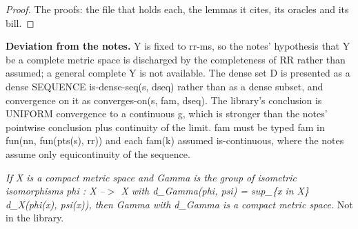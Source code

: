 %
\begin{proof}
%
The proofs: the file that holds each, the lemmas it cites, its oracles and its bill.
%
%
%
%
%
%
%
%
%
%
%
%
%
\end{proof}
%
\noindent\textbf{Deviation from the notes.} Y is fixed to rr-ms, so the notes' hypothesis that Y be a complete metric space is discharged by the completeness of RR rather than assumed; a general complete Y is not available. The dense set D is presented as a dense SEQUENCE is-dense-seq(s, dseq) rather than as a dense subset, and convergence on it as converges-on(s, fam, dseq). The library's conclusion is UNIFORM convergence to a continuous g, which is stronger than the notes' pointwise conclusion plus continuity of the limit. fam must be typed fam in fun(nn, fun(pts(s), rr)) and each fam(k) assumed is-continuous, where the notes assume only equicontinuity of the sequence.
%
\renewcommand{\thethm}{3.37}
\begin{prop}\label{thm:calculus-3.37}
%
\textit{If X is a compact metric space and Gamma is the group of isometric isomorphisms phi : X --$>$ X with d\_Gamma(phi, psi) = sup\_\{x in X\} d\_X(phi(x), psi(x)), then Gamma with d\_Gamma is a compact metric space.}
%
Not in the library.
%
\end{prop}
